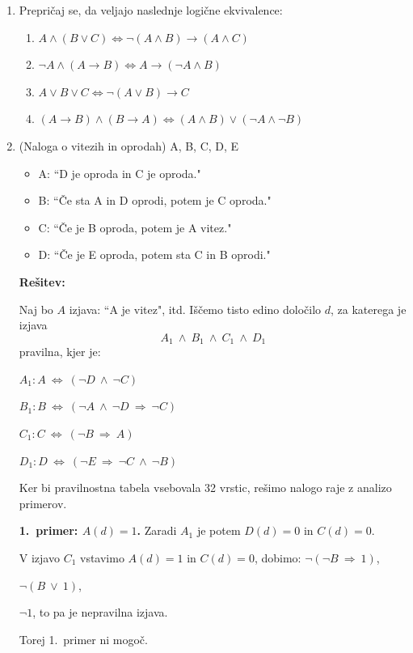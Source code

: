 \documentclass[11pt,paper=b5,footinclude,headinclude]{scrbook} %
\def\ali {{~\vee~}}
\def\inn {{~\wedge~}}
\def\sledi {{~\Rightarrow~}}
\def\cee {{~\Leftrightarrow~}}
\begin{document}
\begin{enumerate}
\item Prepričaj se, da veljajo naslednje logične ekvivalence:
\begin{enumerate}
  \item $A \land (B \lor C) \iff \neg (A \land B) \rightarrow (A \land C)$
  \item $\neg A \land (A \rightarrow B) \iff A \rightarrow (\neg A \land B)$
  \item $A \lor B \lor C \iff \neg (A \lor B) \rightarrow C$
  \item $(A \rightarrow B) \land (B \rightarrow A) \iff (A \land B) \lor (\neg A \land \neg B)$
\end{enumerate}

    \item 
    (Naloga o vitezih in oprodah)
A, B, C, D, E
\begin{itemize}
  \item A: ``D je oproda in C je oproda."
  \item B: ``Če sta A in D oprodi, potem je C oproda."
  \item C: ``Če je B oproda, potem je A vitez."
  \item D: ``Če je E oproda, potem sta C in B oprodi."
\end{itemize}

\medskip
\textbf{Rešitev:}

Naj bo $A$ izjava: ``A je vitez", itd.
Iščemo tisto edino določilo $d$, za katerega je izjava $$A_1\inn B_1\inn C_1\inn D_1$$
pravilna, kjer je:

$A_1: A\cee (\neg D \inn \neg C)$

$B_1: B\cee (\neg A \inn \neg D\sledi \neg C)$

$C_1: C\cee (\neg B \sledi A)$

$D_1: D\cee (\neg E \sledi \neg C \inn \neg B)$


Ker bi pravilnostna tabela vsebovala 32 vrstic, rešimo nalogo
raje z analizo primerov.

\textbf{1.~primer: $A(d) = 1$.}
Zaradi $A_1$ je potem $D(d) = 0$ in $C(d) = 0$.

V izjavo $C_1$ vstavimo $A(d) = 1$ in $C(d) = 0$, dobimo:
$\neg(\neg B\sledi 1)$,

$\neg(B\ali 1)$,

$\neg 1$, to pa je nepravilna izjava.

Torej 1.~primer ni mogoč.
%
%
%
%
%
%


\end{enumerate}
\end{document}
